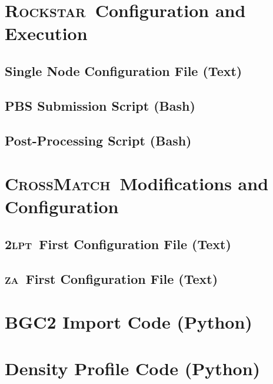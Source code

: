 \documentclass[12pt]{report}
\newcommand{\lpt}{\textsc{2lpt}}
\newcommand{\za}{\textsc{za}}
\newcommand{\rockstar}{\textsc{Rockstar}}
\newcommand{\crossmatch}{\textsc{CrossMatch}}
\begin{document}
\begin{appendices}

	\chapter{\rockstar\ Configuration and Execution}
	\label{app:rockstar}
	\section{Single Node Configuration File (Text)}
	\label{app:onenode}
	
	\section{PBS Submission Script (Bash)}
	\label{app:run_rockstar}
	
	\section{Post-Processing Script (Bash)}
	\label{app:postprocess}
	

	\chapter{\crossmatch\ Modifications and Configuration}
	\label{app:crossmatch}
	\section{\lpt\ First Configuration File (Text)}
	\label{app:crossmatch_2lpt_config}
	
	\section{\za\ First Configuration File (Text)}
	\label{app:crossmatch_za_config}
	

	\chapter{BGC2 Import Code (Python)}
	\label{app:bgc2}
	

	\chapter{Density Profile Code (Python)}
	\label{app:density_profile}
	


\end{appendices}
\end{document}
